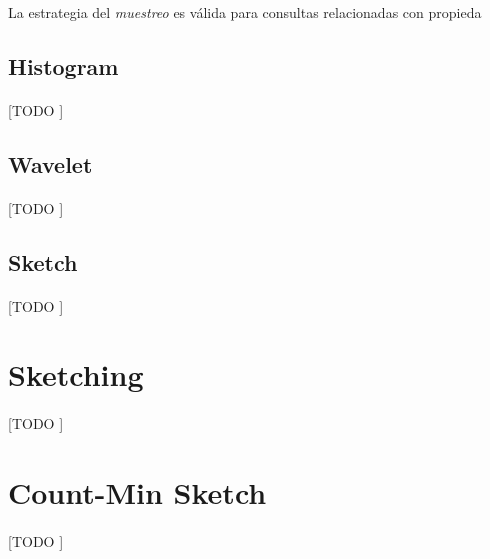 \documentclass{subfiles}
\begin{document}
        \paragraph{}
        La estrategia del \emph{muestreo} es válida para consultas relacionadas con propieda



      \subsection{Histogram}
      \label{sec:histogram}

        \paragraph{}
        [TODO ]

      \subsection{Wavelet}
      \label{sec:wavelet}

        \paragraph{}
        [TODO ]

      \subsection{Sketch}
      \label{sec:sketch}

        \paragraph{}
        [TODO ]

    \section{Sketching}
    \label{sec:sketching}

      \paragraph{}
      [TODO ]

    \section{Count-Min Sketch}
    \label{sec:count_min_sketch}

      \paragraph{}
      [TODO ]
\end{document}
